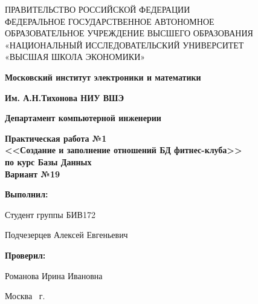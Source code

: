 \begin{titlepage}
	\begin{center}
		ПРАВИТЕЛЬСТВО РОССИЙСКОЙ ФЕДЕРАЦИИ \\
 		ФЕДЕРАЛЬНОЕ  ГОСУДАРСТВЕННОЕ АВТОНОМНОЕ \\
		ОБРАЗОВАТЕЛЬНОЕ УЧРЕЖДЕНИЕ ВЫСШЕГО ОБРАЗОВАНИЯ\\
		«НАЦИОНАЛЬНЫЙ ИССЛЕДОВАТЕЛЬСКИЙ УНИВЕРСИТЕТ\\
		«ВЫСШАЯ ШКОЛА ЭКОНОМИКИ»
	\end{center}
	
	\begin{center}
		\textbf{Московский институт электроники и математики}
		
		\textbf{Им. А.Н.Тихонова НИУ ВШЭ}
		
		\vspace{2ex}
		
		\textbf{Департамент компьютерной инженерии}
	\end{center}
	\vspace{1ex}	
	
	\vspace{1ex}
	\begin{center}
		\textbf{Практическая работа №1 \\
			<<Создание и заполнение отношений БД фитнес-клуба>> \\
			по курс	Базы Данных\\
			Вариант №19
	}
	\end{center}	

	\vspace{2ex}
	\vfill
	
	\vspace{2ex}
	
	\begin{flushright}
		\textbf{Выполнил:}
		
		\vspace{2ex}
		
		Студент группы БИВ172
		
		\vspace{2ex}
		
		Подчезерцев Алексей Евгеньевич
		
		\vspace{2ex}
		
		\textbf{Проверил:}
		
		\vspace{2ex}
		
		Романова Ирина Ивановна
	\end{flushright}

	\vspace{5ex}
	\begin{center}
		Москва \the\year \, г.
	\end{center}
\end{titlepage}